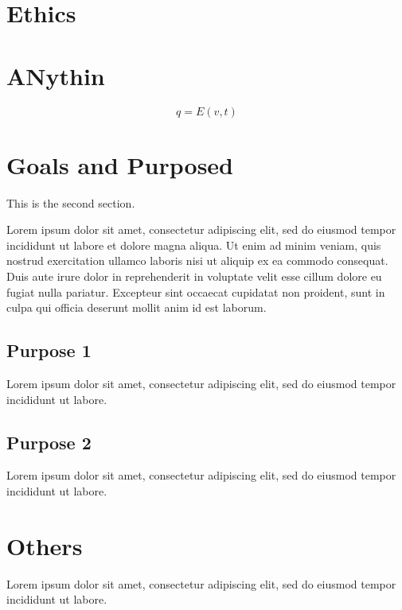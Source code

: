 \documentclass[12pt, a4paper]{report}
\begin{document}
\section{Ethics}
\section{ANythin}
\begin{equation}
q = E(v, t)
\end{equation}


\section{Goals and Purposed}
This is the second section.

Lorem ipsum dolor sit amet, consectetur adipiscing elit, sed do eiusmod tempor incididunt ut labore et dolore magna aliqua. Ut enim ad minim veniam, quis nostrud exercitation ullamco laboris nisi ut aliquip ex ea commodo consequat. Duis aute irure dolor in reprehenderit in voluptate velit esse cillum dolore eu fugiat nulla pariatur. Excepteur sint occaecat cupidatat non proident, sunt in culpa qui officia deserunt mollit anim id est laborum.

\subsection{Purpose 1}
Lorem ipsum dolor sit amet, consectetur adipiscing elit, sed do eiusmod tempor incididunt ut labore.

\subsection{Purpose 2}
Lorem ipsum dolor sit amet, consectetur adipiscing elit, sed do eiusmod tempor incididunt ut labore.

\section*{Others}
Lorem ipsum dolor sit amet, consectetur adipiscing elit, sed do eiusmod tempor incididunt ut labore.



\end{document}
